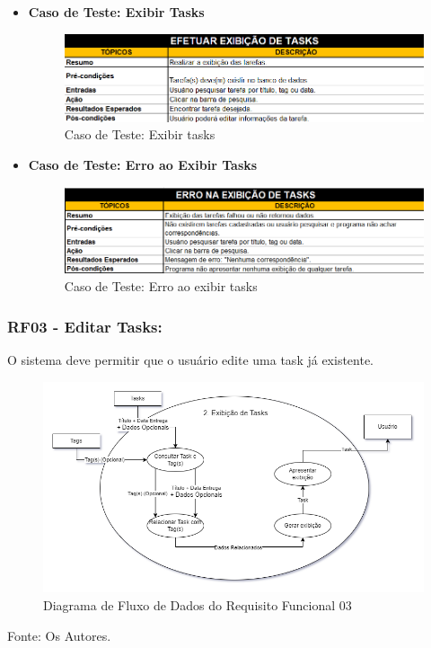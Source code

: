 \documentclass[a4paper,12pt]{article}
\begin{document}
\pagebreak
\begin{itemize}
	\item\textbf{Caso de Teste: Exibir Tasks}
	\begin{figure}[H]
		\centering
		\includegraphics[scale=0.75]{UnitTest/trueCase/showTask.png}
		\caption{Caso de Teste: Exibir tasks}
		\end{figure}
	\item\textbf{Caso de Teste: Erro ao Exibir Tasks}
	\begin{figure}[H]
		\centering
		\includegraphics[scale=0.75]{UnitTest/falseCase/showTask.png}
		\caption{Caso de Teste: Erro ao exibir tasks}
	\end{figure}
\end{itemize}

\pagebreak
\subsubsection{RF03 - Editar Tasks:}
O sistema deve permitir que o usuário edite uma task já existente.
\begin{figure}[H]
	\centering
	\includegraphics[scale=0.45]{DFDs/RF02.drawio.png}
	\caption{Diagrama de Fluxo de Dados do Requisito Funcional 03}
\end{figure}
\noindent Fonte: Os Autores.
\end{document}
